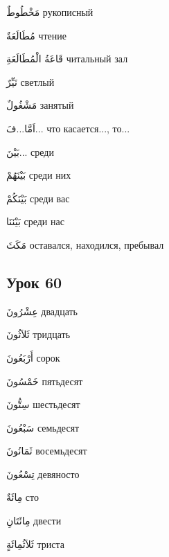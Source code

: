 \documentclass[a5paper]{article}
\newcommand\textstyleDropCaps[1]{#1}
\newcommand\textstyleCaptioncharacters[1]{#1}
\begin{document}
\textstyleCaptioncharacters{مَخْطُوطٌ }\textstyleDropCaps{рукописный‎}

\textstyleCaptioncharacters{مُطَالَعَةٌ }\textstyleDropCaps{чтение‎}

\textstyleCaptioncharacters{قَاعَةُ الْمُطَالَعَةِ }\textstyleDropCaps{читаль­ный зал‎}

\textstyleCaptioncharacters{نَيِّرٌ }\textstyleDropCaps{светлый‎}

\textstyleCaptioncharacters{مَشْغُولٌ }\textstyleDropCaps{занятый‎}

\textstyleCaptioncharacters{اَمَّا...فَ...ِ }\textstyleDropCaps{что касается..., то...‎}

\textstyleCaptioncharacters{بَيْنَ...ِ }\textstyleDropCaps{среди‎}

\textstyleCaptioncharacters{بَيْنَهُمْ }\textstyleDropCaps{среди них‎}

\textstyleCaptioncharacters{بَيْنَكُمْ }\textstyleDropCaps{среди вас‎}

\textstyleCaptioncharacters{بَيْنَنَا }\textstyleDropCaps{среди нас‎}

\textstyleCaptioncharacters{مَكَثَ }\textstyleDropCaps{оставался, находил­ся, пребывал‎}

\subsection[Урок 60‎]{\textstyleDropCaps{Урок 60‎}}
\textstyleCaptioncharacters{عِشْرُونَ }\textstyleDropCaps{двадцать‎}

\textstyleCaptioncharacters{ثَلاَثُونَ }\textstyleDropCaps{тридцать‎}

\textstyleCaptioncharacters{أَرْبَعُونَ }\textstyleDropCaps{сорок‎}

\textstyleCaptioncharacters{خَمْسُونَ }\textstyleDropCaps{пятьдесят‎}

\textstyleCaptioncharacters{سِتُّونَ }\textstyleDropCaps{шестьдесят‎}

\textstyleCaptioncharacters{سَبْعُونَ }\textstyleDropCaps{семьдесят‎}

\textstyleCaptioncharacters{ثَمَانُونَ }\textstyleDropCaps{восемьдесят‎}

\textstyleCaptioncharacters{تِسْعُونَ }\textstyleDropCaps{девяносто‎}

\textstyleCaptioncharacters{مِائَةٌ }\textstyleDropCaps{сто‎}

\textstyleCaptioncharacters{مِائَتَانِ }\textstyleDropCaps{двести‎}

\textstyleCaptioncharacters{ثَلاَثُمِائَةٍ }\textstyleDropCaps{триста‎}
\end{document}
